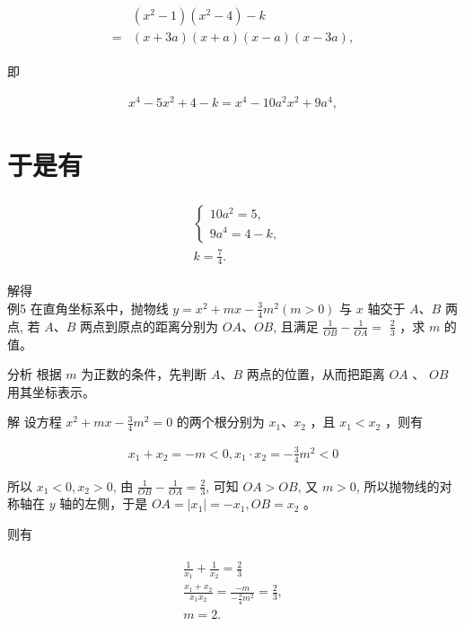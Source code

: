 \documentclass[10pt]{article}
\begin{document}
\begin{align*}
\begin{aligned}
& \left(x^{2}-1\right)\left(x^{2}-4\right)-k \\
= & (x+3 a)(x+a)(x-a)(x-3 a),
\end{aligned}
\end{align*}

即

\begin{align*}
x^{4}-5 x^{2}+4-k=x^{4}-10 a^{2} x^{2}+9 a^{4},
\end{align*}

\section*{于是有}
\begin{align*}
\begin{aligned}
& \left\{\begin{array}{l}
10 a^{2}=5, \\
9 a^{4}=4-k,
\end{array}\right. \\
& k=\frac{7}{4} .
\end{aligned}
\end{align*}

解得\\
例5 在直角坐标系中，抛物线 $y=x^{2}+m x-\frac{3}{4} m^{2}(m>0)$ 与 $x$ 轴交于 $A 、 B$ 两点, 若 $A 、 B$ 两点到原点的距离分别为 $O A 、 O B$, 且满足 $\frac{1}{O B}-\frac{1}{O A}=$ $\frac{2}{3}$ ，求 $m$ 的值。

分析 根据 $m$ 为正数的条件，先判断 $A 、 B$ 两点的位置，从而把距离 $O A$ 、 $O B$ 用其坐标表示。

解 设方程 $x^{2}+m x-\frac{3}{4} m^{2}=0$ 的两个根分别为 $x_{1} 、 x_{2}$ ，且 $x_{1}<x_{2}$ ，则有

\begin{align*}
x_{1}+x_{2}=-m<0, x_{1} \cdot x_{2}=-\frac{3}{4} m^{2}<0
\end{align*}

所以 $x_{1}<0, x_{2}>0$, 由 $\frac{1}{O B}-\frac{1}{O A}=\frac{2}{3}$, 可知 $O A>O B$, 又 $m>0$, 所以抛物线的对称轴在 $y$ 轴的左侧，于是 $O A=\left|x_{1}\right|=-x_{1}, O B=x_{2}$ 。

则有

\begin{align*}
\begin{gathered}
\frac{1}{x_{1}}+\frac{1}{x_{2}}=\frac{2}{3} \\
\frac{x_{1}+x_{2}}{x_{1} x_{2}}=\frac{-m}{-\frac{3}{4} m^{2}}=\frac{2}{3}, \\
m=2 .
\end{gathered}
\end{align*}
\end{document}
